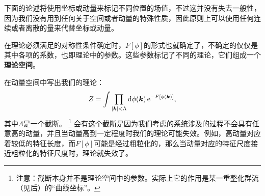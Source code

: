 \documentclass[hyperref, UTF8, a4paper]{ctexart}
\newcommand*{\ee}{\mathrm{e}}
\begin{document}
下面的论述将使用坐标或动量来标记不同位置的场值，不过这并没有失去一般性，因为我们没有用到任何关于空间或者动量的特殊性质，因此原则上可以使用任何连续或者离散的量来代替坐标或动量。

在理论必须满足的对称性条件确定时，$F[\phi]$的形式也就确定了，不确定的仅仅是其中各项的系数，也即理论中的参数。这些参数标记了不同的理论，它们组成一个\textbf{理论空间}。

在动量空间中写出我们的理论：
\begin{equation}
    Z = \int \prod_{\abs{\vb*{k}} < \Lambda} \dd{\phi(\vb*{k})} \ee^{ - F[\phi(\vb*{k})]},
    \label{eq:theory-in-momentum-space}
\end{equation}
其中$\Lambda$是一个截断。%
\footnote{注意：截断本身并不是理论空间中的参数。实际上它的作用是某一重整化群流（见后）的“曲线坐标”。}%
会有这个截断是因为我们考虑的系统涉及的过程不会具有任意高的动量，并且当动量高到一定程度时我们的理论可能失效。例如，高动量对应着较低的特征长度，而$F[\phi]$可能是经过粗粒化的，那么当动量对应的特征尺度接近粗粒化的特征尺度时，理论就失效了。
\end{document}
